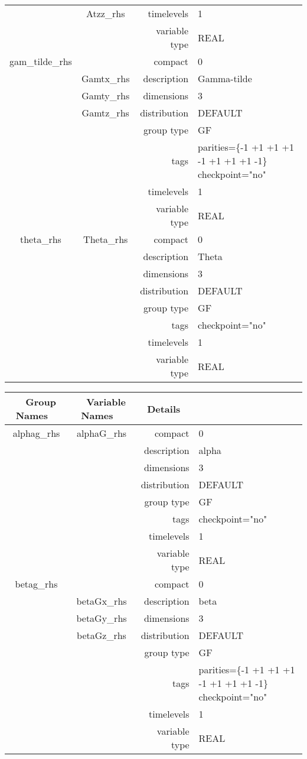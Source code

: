 \begin{tabular*}{150mm}{|c|c@{\extracolsep{\fill}}|rl|}
 & Atzz\_rhs & timelevels & 1 \\ 
 &  & variable type & REAL \\ 
\hline 
gam\_tilde\_rhs &  & compact & 0 \\ 
 & Gamtx\_rhs & description & Gamma-tilde \\ 
 & Gamty\_rhs & dimensions & 3 \\ 
 & Gamtz\_rhs & distribution & DEFAULT \\ 
 &  & group type & GF \\ 
 &  & tags & parities=\{-1 +1 +1   +1 -1 +1   +1 +1 -1\} checkpoint="no" \\ 
 &  & timelevels & 1 \\ 
 &  & variable type & REAL \\ 
\hline 
theta\_rhs & Theta\_rhs & compact & 0 \\ 
 &  & description & Theta \\ 
 &  & dimensions & 3 \\ 
 &  & distribution & DEFAULT \\ 
 &  & group type & GF \\ 
 &  & tags & checkpoint="no" \\ 
 &  & timelevels & 1 \\ 
 &  & variable type & REAL \\ 
\hline 
\end{tabular*} 



\vspace{5mm}
\vspace{5mm}

\begin{tabular*}{150mm}{|c|c@{\extracolsep{\fill}}|rl|} \hline 
~ {\bf Group Names} ~ & ~ {\bf Variable Names} ~  &{\bf Details} ~ & ~ \\ 
\hline 
alphag\_rhs & alphaG\_rhs & compact & 0 \\ 
 &  & description & alpha \\ 
 &  & dimensions & 3 \\ 
 &  & distribution & DEFAULT \\ 
 &  & group type & GF \\ 
 &  & tags & checkpoint="no" \\ 
 &  & timelevels & 1 \\ 
 &  & variable type & REAL \\ 
\hline 
betag\_rhs &  & compact & 0 \\ 
 & betaGx\_rhs & description & beta \\ 
 & betaGy\_rhs & dimensions & 3 \\ 
 & betaGz\_rhs & distribution & DEFAULT \\ 
 &  & group type & GF \\ 
 &  & tags & parities=\{-1 +1 +1   +1 -1 +1   +1 +1 -1\} checkpoint="no" \\ 
 &  & timelevels & 1 \\ 
 &  & variable type & REAL \\ 
\hline 
\end{tabular*} 



